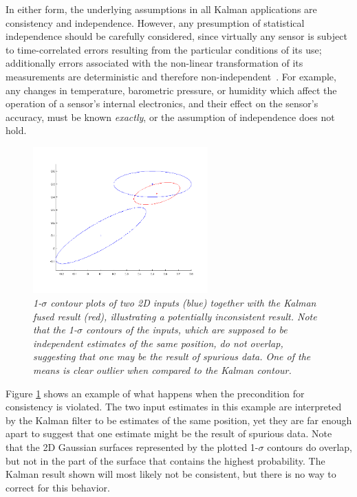 In either form, the underlying assumptions in all Kalman applications are consistency and independence. However, any
presumption of statistical independence should be carefully considered, since virtually any sensor is subject to
time-correlated errors resulting from the particular conditions of its use; additionally errors associated with the 
non-linear transformation of its measurements are deterministic and therefore non-independent~\cite{uhlmann03}. For
example, any changes in temperature, barometric pressure, or humidity which affect the operation of a sensor's internal
electronics, and their effect on the sensor's accuracy, must be known {\em exactly}, or the assumption of independence
does not hold.
\begin{figure}[tbp]
    \centering\includegraphics[width=0.6\textwidth]{figures/kalman2d-i.png}
    \caption{\it 1-$\sigma$ contour plots of two 2D inputs (blue) together with the Kalman fused result (red),
        illustrating a potentially inconsistent result. Note that the 1-$\sigma$ contours of the inputs, which are
        supposed to be independent estimates of the same position, do not overlap, suggesting that one may be the result
        of spurious data. One of the means is clear outlier when compared to the Kalman contour.}
    \label{fig:kalman2d-i}
\end{figure}
Figure \ref{fig:kalman2d-i} shows an example of what happens when the precondition for consistency is violated. The two
input estimates in this example are interpreted by the Kalman filter to be estimates of the same position, yet they are
far enough apart to suggest that one estimate might be the result of spurious data. Note that the 2D Gaussian surfaces
represented by the plotted 1-$\sigma$ contours do overlap, but not in the part of the surface that contains the highest
probability. The Kalman result shown will most likely not be consistent, but there is no way to correct for this
behavior.

